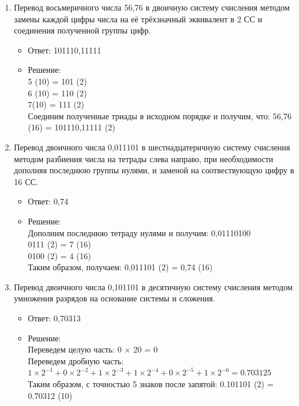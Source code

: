 \documentclass[14pt,final,oneside]{extreport}%
\begin{document}
\begin{enumerate}
        \item Перевод восьмеричного числа 56,76 в двоичную систему счисления методом замены каждой цифры числа на её трёхзначный эквивалент в 2 СС и соединения полученной группы цифр.
        \begin{itemize}
            \item Ответ: 101110,11111
            \item Решение: \\
                5 (10) = 101 (2) \\
                6 (10) = 110 (2) \\
                7(10) = 111 (2) \\
                Соединим полученные триады в исходном порядке и получим, что: 56,76 (16) = 101110,11111 (2)
        \end{itemize}

        \item Перевод двоичного числа 0,011101 в шестнадцатеричную систему счисления методом разбиения числа на тетрады слева направо, при необходимости дополняя последнюю группы нулями, и заменой на соотвествующую цифру в 16 СС.
        \begin{itemize}
            \item Ответ: 0,74
            \item Решение: \\
                Дополним последнюю тетраду нулями и получим: 0,01110100 \\
                0111 (2) = 7 (16) \\
                0100 (2) = 4 (16) \\
                Таким образом, получаем:  0,011101 (2) = 0,74 (16)
        \end{itemize}

        \item Перевод двоичного числа 0,101101 в десятичную систему счисления методом умножения разрядов на основание системы и сложения.
        \begin{itemize}
            \item Ответ: 0,70313
            \item Решение: \\
                Переведем целую часть: 0 × 20 = 0 \\
                Переведем дробную часть: \( 1 \times 2^{-1} + 0 \times 2^{-2} + 1 \times 2^{-3} + 1 \times 2^{-4} + 0 \times 2^{-5} + 1 \times 2^{-6} = 0.703125 \) \\
                Таким образом, с точностью 5 знаков после запятой: 0.101101 (2) = 0.70312 (10)
        \end{itemize}


\end{enumerate}
\end{document}
